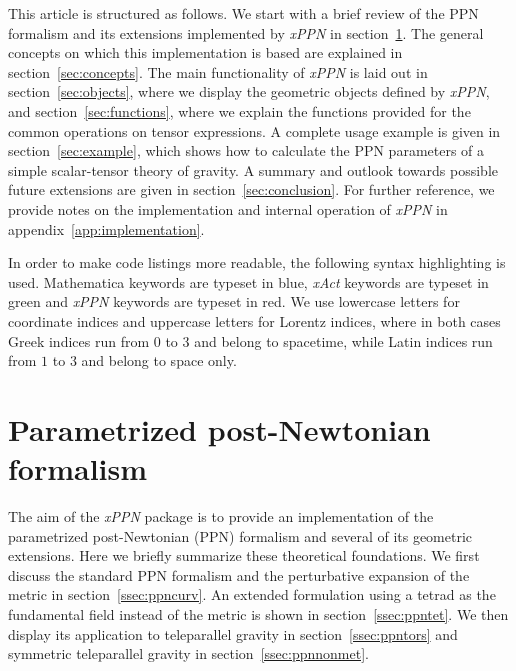 \documentclass[notitlepage,a4paper,aps,prd,onecolumn,superscriptaddress,nofootinbib,groupedaddress,longbibliography]{revtex4-1}
\newcommand{\xPPN}{\emph{xPPN}}
\newcommand{\xAct}{\emph{xAct}}
\begin{document}
This article is structured as follows. We start with a brief review of the PPN formalism and its extensions implemented by \xPPN{} in section~\ref{sec:ppn}. The general concepts on which this implementation is based are explained in section~\ref{sec:concepts}. The main functionality of \xPPN{} is laid out in section~\ref{sec:objects}, where we display the geometric objects defined by \xPPN, and section~\ref{sec:functions}, where we explain the functions provided for the common operations on tensor expressions. A complete usage example is given in section~\ref{sec:example}, which shows how to calculate the PPN parameters of a simple scalar-tensor theory of gravity. A summary and outlook towards possible future extensions are given in section~\ref{sec:conclusion}. For further reference, we provide notes on the implementation and internal operation of \xPPN{} in appendix~\ref{app:implementation}.

In order to make code listings more readable, the following syntax highlighting is used. Mathematica keywords are typeset in {\color{DarkBlue}blue}, \xAct{} keywords are typeset in {\color{DarkGreen}green} and \xPPN{} keywords are typeset in {\color{DarkRed}red}. We use lowercase letters for coordinate indices and uppercase letters for Lorentz indices, where in both cases Greek indices run from \(0\) to \(3\) and belong to spacetime, while Latin indices run from \(1\) to \(3\) and belong to space only.

\section{Parametrized post-Newtonian formalism}\label{sec:ppn}
The aim of the \xPPN{} package is to provide an implementation of the parametrized post-Newtonian (PPN) formalism and several of its geometric extensions. Here we briefly summarize these theoretical foundations. We first discuss the standard PPN formalism and the perturbative expansion of the metric in section~\ref{ssec:ppncurv}. An extended formulation using a tetrad as the fundamental field instead of the metric is shown in section~\ref{ssec:ppntet}. We then display its application to teleparallel gravity in section~\ref{ssec:ppntors} and symmetric teleparallel gravity in section~\ref{ssec:ppnnonmet}.
\end{document}
